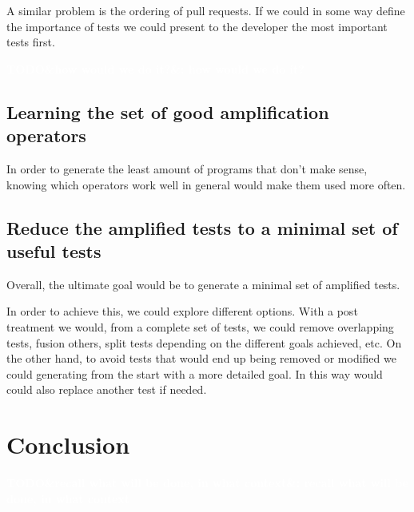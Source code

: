 \documentclass[11pt]{sdm}
\newcommand{\todo}[1]{\colorbox{Red!75}{\textcolor{white}{\textbf{TODO\ifx&#1&\else: #1\fi}}}}
\begin{document}
A similar problem is the ordering of pull requests.
If we could in some way define the importance of tests we could present to the developer the most important tests first.

\todo{how would we do it?}

\subsection{Learning the set of good amplification operators}
\label{learning}
In order to generate the least amount of programs that don't make sense, knowing which operators work well in general would make them used more often.

\subsection{Reduce the amplified tests to a minimal set of useful tests}
\label{minimal}
Overall, the ultimate goal would be to generate a minimal set of amplified tests.

In order to achieve this, we could explore different options.
With a post treatment we would, from a complete set of tests, we could remove overlapping tests, fusion others, split tests depending on the different goals achieved, etc.
On the other hand, to avoid tests that would end up being removed or modified we could generating from the start with a more detailed goal.
In this way would could also replace another test if needed.


\section*{Conclusion}
\label{conclu}
\todo{recall what will be done, in what context}




\end{document}
